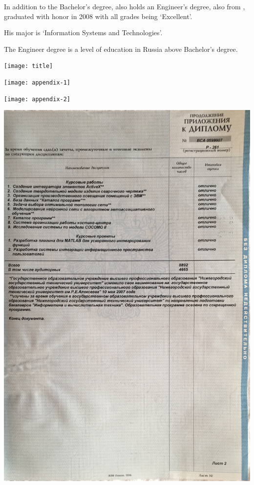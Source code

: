 
In addition to the Bachelor's degree, \mrl also holds an Engineer's degree, also from \Nntu,
graduated with honor in 2008 with all grades being `Excellent'.

His major is `Information Systems and Technologies'.

The Engineer degree is a level of education in Russia above Bachelor's degree.



\begin{center}
    \texttt{[image: title]}
\end{center}
\pagebreak

\begin{center}
    \texttt{[image: appendix-1]}
\end{center}
\pagebreak

\begin{center}
    \texttt{[image: appendix-2]}
\end{center}
\pagebreak

\begin{center}
    \includegraphics[width=38em]{appendix-3}
\end{center}

\pagebreak
